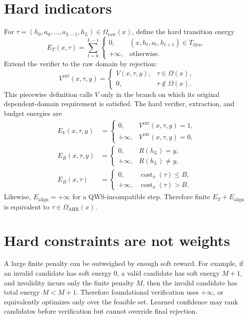 \documentclass[11pt,oneside]{book}
\theoremstyle{remark}
\newcommand{\Om}{\Omega}
\DeclareMathOperator{\cost}{cost}
\begin{document}
\section{Hard indicators}

For
$\tau=(h_0,a_0,\ldots,a_{L-1},h_L)\in\Om_{\mathrm{raw}}(x)$, define the hard
transition energy
\[
E_T(x,\tau)
=\sum_{t=0}^{L-1}
\begin{cases}
0,&(x,h_t,a_t,h_{t+1})\in T_{\mathrm{dyn}},\\
+\infty,&\text{otherwise}.
\end{cases}
\]
Extend the verifier to the raw domain by rejection:
\[
V^{\mathrm{ext}}(x,\tau,y)=
\begin{cases}
V(x,\tau,y),&\tau\in\Om(x),\\
0,&\tau\notin\Om(x).
\end{cases}
\]
This piecewise definition calls $V$ only in the branch on which its original
dependent-domain requirement is satisfied. The hard verifier, extraction, and
budget energies are
\begin{align*}
E_V(x,\tau,y)&=
\begin{cases}
0,&V^{\mathrm{ext}}(x,\tau,y)=1,\\
+\infty,&V^{\mathrm{ext}}(x,\tau,y)=0,
\end{cases}\\
E_R(x,\tau,y)&=
\begin{cases}0,&R(h_L)=y,\\+\infty,&R(h_L)\ne y,\end{cases}\\
E_B(x,\tau)&=
\begin{cases}0,&\cost_x(\tau)\le B,\\+\infty,&\cost_x(\tau)>B.\end{cases}
\end{align*}
Likewise, $E_{\mathrm{align}}=+\infty$ for a QWS-incompatible step.
Therefore finite $E_T+E_{\mathrm{align}}$ is equivalent to
$\tau\in\Om_{\mathrm{AHR}}(x)$.

\section{Hard constraints are not weights}

A large finite penalty can be outweighed by enough soft reward. For example,
if an invalid candidate has soft energy $0$, a valid candidate has soft energy
$M+1$, and invalidity incurs only the finite penalty $M$, then the invalid
candidate has total energy $M<M+1$. Therefore foundational verification uses
$+\infty$, or equivalently optimizes only over the feasible set. Learned
confidence may rank candidates before verification but cannot override final
rejection.
\end{document}
